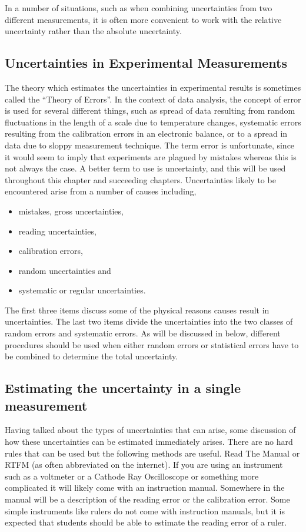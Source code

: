 In a number of situations, such as when combining uncertainties from two different measurements, it is often more convenient to work with the relative uncertainty rather than the absolute uncertainty.


\subsection{Uncertainties in Experimental Measurements}
The theory which estimates the uncertainties in experimental results is sometimes called the ``Theory of Errors''. In the context of data analysis, the concept of error is used for several different things, such as spread of data resulting from random fluctuations in the length of a scale due to temperature changes, systematic errors resulting from the calibration errors in an electronic balance, or to a spread in data due to sloppy measurement technique. The term error is unfortunate, since it would seem to imply that experiments are plagued by mistakes whereas this is not always the case. A better term to use is uncertainty, and this will be used throughout this chapter and succeeding chapters. Uncertainties likely to be encountered arise from a number of causes including,
\begin{itemize}
\item mistakes, gross uncertainties,
\item reading uncertainties,
\item calibration errors,
\item random uncertainties and
\item systematic or regular uncertainties.
\end{itemize}
The first three items discuss some of the physical reasons causes result in uncertainties. The last two items divide the uncertainties into the two classes of random errors and systematic errors. As will be discussed in below, different procedures should be used when either random errors or statistical errors have to be combined to determine the total uncertainty.


\subsection{Estimating the uncertainty in a single measurement}
Having talked about the types of uncertainties that can arise, some discussion of how these uncertainties can be estimated immediately arises. There are no hard rules that can be used but the following methods are useful. Read The Manual or RTFM (as often abbreviated on the internet). If you are using an instrument such as a voltmeter or a Cathode Ray Oscilloscope or something more complicated it will likely come with an instruction manual. Somewhere in the manual will be a description of the reading error or the calibration error. Some simple instruments like rulers do not come with instruction manuals, but it is expected that students should be able to estimate the reading error of a ruler.

